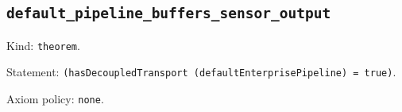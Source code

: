 \documentclass[11pt]{article}
\begin{document}
\subsection*{\texttt{default\_pipeline\_buffers\_sensor\_output}}
\noindent Kind: \texttt{theorem}.\par
\noindent Statement: \texttt{(hasDecoupledTransport (defaultEnterprisePipeline) = true)}.\par
\noindent Axiom policy: \texttt{none}.\par
\end{document}
